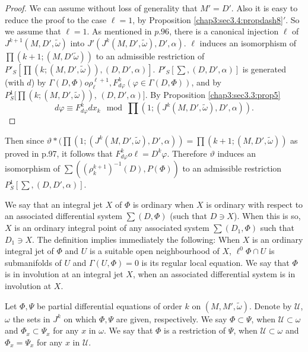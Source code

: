 \begin{proof}
  We can assume without loss of generality that $M'=D'$. Also it is
  easy to reduce the proof to the case $\ell=1$, by Proposition
  \ref{chap3:sec3.4:propdash8}$'$. So we assume that $\ell=1$. As mentioned in $p.96$, there is a
  canonical injection $\ell$ of $J^{k+1} (M,D',\tilde{\omega})$ into
  $J'(J^k(M,D',\tilde{\omega}), D', \alpha)$. $\ell$ induces an
  isomorphism of $\prod (k+1;(M,D'\tilde{\omega}))$ to an admissible
  restriction of $P'_S\left[\prod (k; (M,D',\tilde{\omega})),
    (D,D',\alpha)\right]$. $P'_S\left[\sum, (D,D',\alpha)\right]$ is\pageoriginale
  generated (with $d$) by $\Gamma(D,\Phi) o \rho^{\ell+1}_\ell,
  F^k_{d\varphi} (\varphi \in \Gamma (D,\Phi))$, and by $P^1_S
  [\prod (k; (M,D',\tilde{\omega}))$, \break $(D,D',\alpha)]$. By
  Proposition \ref{chap3:sec3.3:prop5} 
  $$
  d \varphi\equiv F^k_{d\varphi} dx_k \mod \prod (1; (J^k (M,D',
  \tilde{\omega}),D',\alpha)). 
  $$
\end{proof}

Then since $\vartheta*(\prod (1; (J^k (M,D',\tilde{\omega}), D',\alpha)) =
\prod (k+1; (M,D', \tilde\omega))$ as proved in p.97, it follows
that $F^k_{d\varphi}o \ell = D^k \varphi$. Therefore $\vartheta$ induces
an isomorphism of $\sum((\rho ^{k+1}_{k})^{-1} (D),P(\Phi))$ to an
admissible restriction $P^1_S \left [ \sum, (D,D',\alpha)\right]$. 

We say that an integral jet $X$ of $\Phi$ is ordinary when $X$ is
ordinary with respect to an associated differential system
$\sum(D,\Phi)$ (such that $D \ni X$). When this is so, $X$ is an
ordinary integral point of any associated system $\sum(D_1, \Phi)$
such that $D_1 \ni X$. The definition implies immediately the
following: When $X$ is an ordinary integral jet of $\Phi$ and $U$ is a
suitable open neighbourhood of $X$, $\ell^0 \Phi \cap U$ is
submanifolds of $U$ and $\Gamma (U, \Phi)=0$ is its regular local
equation. We say that $\Phi$ is in involution at an integral jet $X$,
when an associated differential system is in involution at $X$.  

Let $\Phi,\Psi$ be partial differential equations of order $k$ on $(M,
M', \tilde{\omega})$. Denote by $\mathscr{U}$, $\omega$ the sets in
$J^k$ on which $\Phi,\Psi$
are given, respectively. We say $\Phi \subset \Psi$, when
$\mathscr{U}\subset \omega$ and $\Phi_x \subset \Psi_x$ for any
$x$ in $\omega$. We say that $\Phi$ is a restriction of $\Psi$,
when $\mathscr{U} \subset \omega$ and $\Phi_x = \Psi_x$ for any $x$ in
$\mathscr{U}$. 

